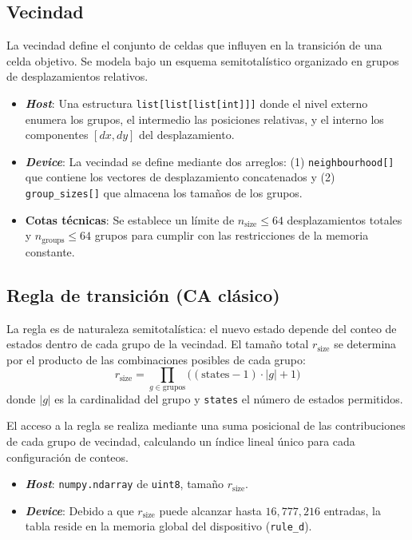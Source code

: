 \subsection{Vecindad}

La vecindad define el conjunto de celdas que influyen en la transición de una celda objetivo. Se modela bajo un esquema semitotalístico organizado en grupos de desplazamientos relativos.

\begin{itemize}
	\item \textbf{\textit{Host}}: Una estructura \texttt{list[list[list[int]]]} donde el nivel externo enumera los grupos, el intermedio las posiciones relativas, y el interno los componentes $[dx, dy]$ del desplazamiento.
	
	\item \textbf{\textit{Device}}: La vecindad se define mediante dos arreglos: (1) \texttt{neighbourhood[]} que contiene los vectores de desplazamiento concatenados y (2) \texttt{group\_sizes[]} que almacena los tamaños de los grupos. 
	
	\item \textbf{Cotas técnicas}: Se establece un límite de $n_{\text{size}} \leq 64$ desplazamientos totales y $n_{\text{groups}} \leq 64$ grupos para cumplir con las restricciones de la memoria constante.
\end{itemize}

\subsection{Regla de transición (CA clásico)}

La regla es de naturaleza semitotalística: el nuevo estado depende del conteo de estados dentro de cada grupo de la vecindad. El tamaño total $r_{\text{size}}$ se determina por el producto de las combinaciones posibles de cada grupo:
\[
r_{\text{size}} = \prod_{g \in \text{grupos}} \big((\text{states}-1)\cdot |g| + 1\big)
\]
donde $|g|$ es la cardinalidad del grupo y \texttt{states} el número de estados permitidos.

El acceso a la regla se realiza mediante una suma posicional de las contribuciones de cada grupo de vecindad, calculando un índice lineal único para cada configuración de conteos.

\begin{itemize}
	\item \textbf{\textit{Host}}: \texttt{numpy.ndarray} de \texttt{uint8}, tamaño $r_{\text{size}}$.
	
	\item \textbf{\textit{Device}}: Debido a que $r_{\text{size}}$ puede alcanzar hasta $16{,}777{,}216$ entradas, la tabla reside en la memoria global del dispositivo (\texttt{rule\_d}).
\end{itemize}

